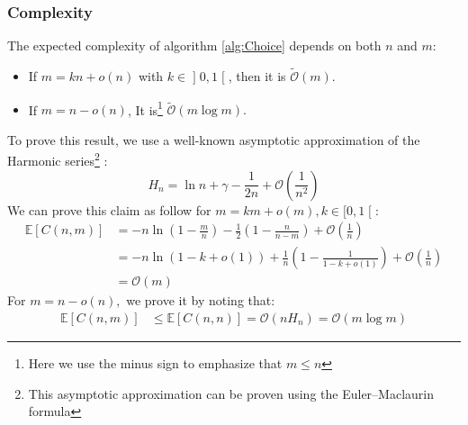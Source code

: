 \subsubsection{Complexity}
The expected complexity of algorithm \ref{alg:Choice} depends on both $n$ and $m$:
\begin{itemize}
	\item If $m=kn+o(n)$ with $k\in\mathopen]0,1\mathclose[$, then it is $\tilde{\mathcal{O}}(m).$
	\item If $m=n-o(n)$, It is\footnote{Here we use the minus sign to emphasize that $m\le n$} $\tilde{\mathcal{O}}(m\log m).$ 
\end{itemize}
To prove this result, we use a well-known asymptotic approximation of the Harmonic series\footnote{This asymptotic approximation can be proven using the Euler–Maclaurin formula} \cite[Section~1.2.11.2]{ArtComputerProgramming}:
$$
H_n=\ln n+\gamma -\frac{1}{2n}+\mathcal{O}\left(\frac{1}{n^2}\right)
$$
We can prove this claim as follow for $m=km+o(m),k\in \mathopen[0,1\mathclose[$:
\begin{align}
	\mathbb{E}[C(n,m)]&=-n\ln \left(1-\frac{m}{n}\right) -\frac{1}{2}\left(1-\frac{n}{n-m}\right)+\mathcal{O}\left(\frac{1}{n}\right) \nonumber \\
&=-n\ln (1-k+o(1))+\frac{1}{n}(1-\tfrac{1}{1-k+o(1)})+\mathcal{O}(\tfrac{1}{n}) \label{eqn:ChoiceBigO} \\
&=\mathcal{O}(m) \nonumber
\end{align}
For $m=n-o(n),$ we prove it by noting that:
\begin{align*}
\mathbb{E}[C(n,m)]&\le\mathbb{E}[C(n,n)]= \mathcal{O} (nH_n) =\mathcal{O}(m\log m)
\end{align*}

